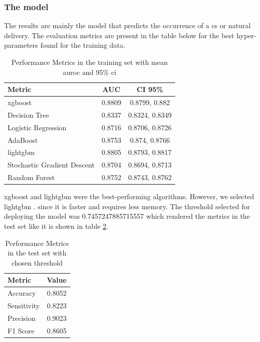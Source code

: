 \subsubsection{The model}
The results are mainly the model that predicts the occurrence of a \ac{cs} or natural delivery. 
The evaluation metrics are present in the table below for the best hyper-parameters found for the training data.

\begin{table}[htbp]
  \centering
  \caption[Performance Metrics in the training set]{Performance Metrics in the training set with mean \ac{auroc} and 95\% \acl{ci}}
  \label{tab:performance_metrics_auc}
  \renewcommand{\arraystretch}{1.5} %
  \setlength{\tabcolsep}{12pt} %
  \begin{tabular}{lcc}
    \hline
    \textbf{Metric} & \textbf{AUC} & \textbf{CI 95\%} \\
    \hline
    \ac{xgboost} & 0.8809 & 0.8799, 0.882 \\  
    Decision Tree & 0.8337 & 0.8324, 0.8349 \\
    Logistic Regression & 0.8716 & 0.8706, 0.8726 \\
    AdaBoost & 0.8753 & 0.874, 0.8766 \\ 
    \ac{lightgbm} & 0.8805 & 0.8793, 0.8817 \\ 
    Stochastic Gradient Descent & 0.8704 & 0.8694, 0.8713 \\ 
    Random Forest & 0.8752 & 0.8743, 0.8762 \\  
    \hline
  \end{tabular}
\end{table}



\ac{xgboost} and \ac{lightgbm} were the best-performing algorithms. However, we selected \ac{lightgbm} \cite{lightgbm}. since it is faster and requires less memory. The threshold selected for deploying the model was 0.7457247885715557 which rendered the metrics in the test set like it is shown in table \ref{tab:performance_metrics_threshold}.

\begin{table}[htbp]
  \centering
  \caption{Performance Metrics in the test set with chosen threshold}
  \label{tab:performance_metrics_threshold}
  \renewcommand{\arraystretch}{1.5} %
  \setlength{\tabcolsep}{12pt} %
  \begin{tabular}{lc}
    \hline
    \textbf{Metric} & \textbf{Value} \\
    \hline
    Accuracy & 0.8052 \\
    Sensitivity & 0.8223 \\
    Precision & 0.9023 \\
    F1 Score & 0.8605 \\
    \hline
  \end{tabular}
\end{table}




